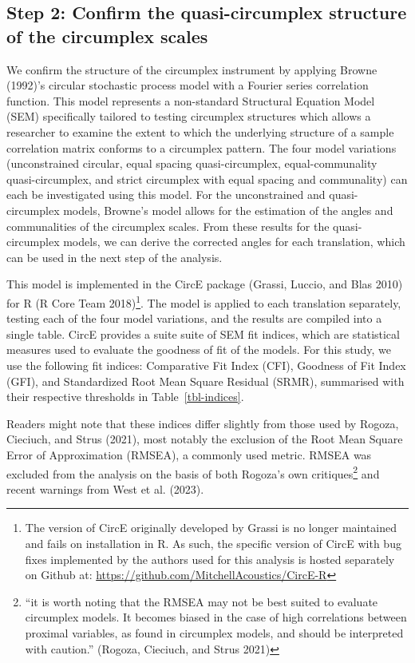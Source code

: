 \documentclass[
  default,
]{sn-jnl}
\begin{document}
\subsection{Step 2: Confirm the quasi-circumplex structure of the
circumplex
scales}\label{step-2-confirm-the-quasi-circumplex-structure-of-the-circumplex-scales}

We confirm the structure of the circumplex instrument by applying Browne
(1992)'s circular stochastic process model with a Fourier series
correlation function. This model represents a non-standard Structural
Equation Model (SEM) specifically tailored to testing circumplex
structures which allows a researcher to examine the extent to which the
underlying structure of a sample correlation matrix conforms to a
circumplex pattern. The four model variations (unconstrained circular,
equal spacing quasi-circumplex, equal-communality quasi-circumplex, and
strict circumplex with equal spacing and communality) can each be
investigated using this model. For the unconstrained and
quasi-circumplex models, Browne's model allows for the estimation of the
angles and communalities of the circumplex scales. From these results
for the quasi-circumplex models, we can derive the corrected angles for
each translation, which can be used in the next step of the analysis.

This model is implemented in the CircE package (Grassi, Luccio, and Blas
2010) for R (R Core Team 2018)\footnote{The version of CircE originally
  developed by Grassi is no longer maintained and fails on installation
  in R. As such, the specific version of CircE with bug fixes
  implemented by the authors used for this analysis is hosted separately
  on Github at: \url{https://github.com/MitchellAcoustics/CircE-R}}. The
model is applied to each translation separately, testing each of the
four model variations, and the results are compiled into a single table.
CircE provides a suite suite of SEM fit indices, which are statistical
measures used to evaluate the goodness of fit of the models. For this
study, we use the following fit indices: Comparative Fit Index (CFI),
Goodness of Fit Index (GFI), and Standardized Root Mean Square Residual
(SRMR), summarised with their respective thresholds in
Table~\ref{tbl-indices}.

Readers might note that these indices differ slightly from those used by
Rogoza, Cieciuch, and Strus (2021), most notably the exclusion of the
Root Mean Square Error of Approximation (RMSEA), a commonly used metric.
RMSEA was excluded from the analysis on the basis of both Rogoza's own
critiques\footnote{``it is worth noting that the RMSEA may not be best
  suited to evaluate circumplex models. It becomes biased in the case of
  high correlations between proximal variables, as found in circumplex
  models, and should be interpreted with caution.'' (Rogoza, Cieciuch,
  and Strus 2021)} and recent warnings from West et al. (2023).
\end{document}
